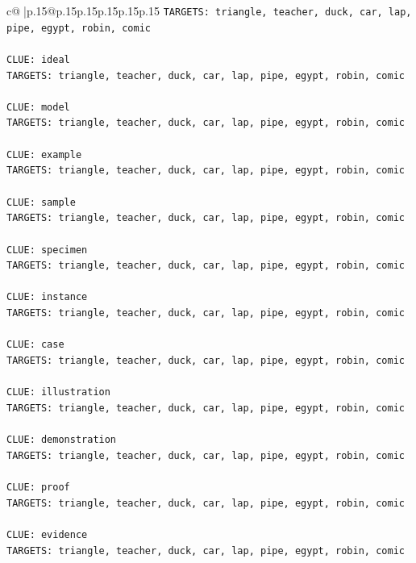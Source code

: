 \documentclass{article}
\begin{document}
{\begin{supertabular}{c@{$\;$}|p{.15\linewidth}@{}p{.15\linewidth}p{.15\linewidth}p{.15\linewidth}p{.15\linewidth}p{.15\linewidth}}
{{{\texttt{TARGETS: triangle, teacher, duck, car, lap, pipe, egypt, robin, comic} \\
\\ 
\texttt{CLUE: ideal} \\
\texttt{TARGETS: triangle, teacher, duck, car, lap, pipe, egypt, robin, comic} \\
\\ 
\texttt{CLUE: model} \\
\texttt{TARGETS: triangle, teacher, duck, car, lap, pipe, egypt, robin, comic} \\
\\ 
\texttt{CLUE: example} \\
\texttt{TARGETS: triangle, teacher, duck, car, lap, pipe, egypt, robin, comic} \\
\\ 
\texttt{CLUE: sample} \\
\texttt{TARGETS: triangle, teacher, duck, car, lap, pipe, egypt, robin, comic} \\
\\ 
\texttt{CLUE: specimen} \\
\texttt{TARGETS: triangle, teacher, duck, car, lap, pipe, egypt, robin, comic} \\
\\ 
\texttt{CLUE: instance} \\
\texttt{TARGETS: triangle, teacher, duck, car, lap, pipe, egypt, robin, comic} \\
\\ 
\texttt{CLUE: case} \\
\texttt{TARGETS: triangle, teacher, duck, car, lap, pipe, egypt, robin, comic} \\
\\ 
\texttt{CLUE: illustration} \\
\texttt{TARGETS: triangle, teacher, duck, car, lap, pipe, egypt, robin, comic} \\
\\ 
\texttt{CLUE: demonstration} \\
\texttt{TARGETS: triangle, teacher, duck, car, lap, pipe, egypt, robin, comic} \\
\\ 
\texttt{CLUE: proof} \\
\texttt{TARGETS: triangle, teacher, duck, car, lap, pipe, egypt, robin, comic} \\
\\ 
\texttt{CLUE: evidence} \\
\texttt{TARGETS: triangle, teacher, duck, car, lap, pipe, egypt, robin, comic} \\
}}}
\end{supertabular}}
\end{document}
